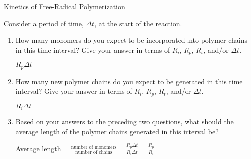 \begin{activity}{Kinetics of Free-Radical Polymerization}
\begin{ctqs}
\begin{enumerate}
				\begin{solution}[1.5in]\end{solution}
			
		\end{enumerate}
	
	\question Consider a period of time, $\Delta t$, at the start of the reaction.
	
		\begin{enumerate}
			
			\item How many monomers do you expect to be incorporated into polymer chains in this time interval?  Give your answer in terms of $R_i$, $R_p$, $R_t$, and/or $\Delta t$.
			
				\begin{solution}[0.5in]
				
					$R_p \Delta t$
					
				\end{solution}
			
			\item How many new polymer chains do you expect to be generated in this time interval?  Give your answer in terms of $R_i$, $R_p$, $R_t$, and/or $\Delta t$.
			
				\begin{solution}[0.5in]
				
					$R_i \Delta t$
					
				\end{solution}
			
			\item Based on your answers to the preceding two questions, what should the average length of the polymer chains generated in this interval be?
			
				\begin{solution}[0.75in]
				
					Average length = $\frac{\text{number of monomers}}{\text{number of chains}} = \frac{R_p\Delta t}{R_i \Delta t} = \frac{R_p}{R_i}$				
				
				\end{solution}
				
		\end{enumerate}
	

\end{ctqs}
\end{activity}
